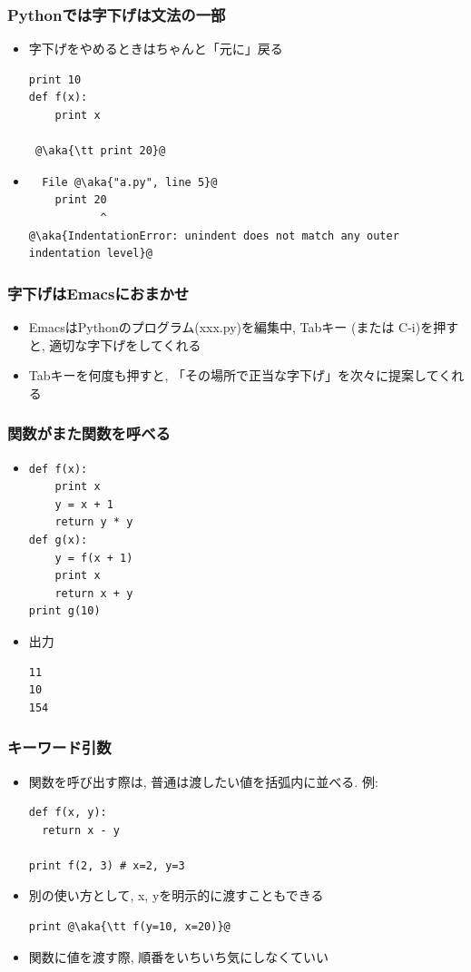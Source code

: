 \documentclass[10pt,dvipdfmx]{beamer}
\newcommand{\ao}[1]{{\color{blue}#1}}
\newcommand{\aka}[1]{{\color{red}#1}}
\begin{document}
\begin{frame}[fragile]
\frametitle{Pythonでは字下げは文法の一部}
\begin{itemize}
\item 字下げをやめるときはちゃんと「元に」戻る
\begin{lstlisting}
print 10
def f(x):
    print x

 @\aka{\tt print 20}@
\end{lstlisting}
\item 
\begin{lstlisting}
  File @\aka{"a.py", line 5}@
    print 20
           ^
@\aka{IndentationError: unindent does not match any outer indentation level}@
\end{lstlisting}
\end{itemize}
\end{frame}


\begin{frame}[fragile]
\frametitle{字下げはEmacsにおまかせ}
\begin{itemize}
\item EmacsはPythonのプログラム(xxx.py)を編集中, 
\ao{Tabキー (または C-i)を押すと, 適切な字下げ}をしてくれる
\item Tabキーを何度も押すと, 
「その場所で正当な字下げ」を次々に提案してくれる
\end{itemize}
\end{frame}


\begin{frame}[fragile]
\frametitle{関数がまた関数を呼べる}

\begin{itemize}
\item 
\begin{lstlisting}
def f(x):
    print x
    y = x + 1
    return y * y
def g(x):
    y = f(x + 1)
    print x
    return x + y
print g(10)
\end{lstlisting}
\item<2> 出力
\begin{lstlisting}
11
10
154
\end{lstlisting}
\end{itemize}
\end{frame}

\begin{frame}[fragile]
\frametitle{キーワード引数}
\begin{itemize}
\item 関数を呼び出す際は, 普通は渡したい値を括弧内に並べる. 例:
\begin{lstlisting}
def f(x, y):
  return x - y

print f(2, 3) # x=2, y=3
\end{lstlisting}

\item 別の使い方として, x, yを明示的に渡すこともできる
\begin{lstlisting}
print @\aka{\tt f(y=10, x=20)}@
\end{lstlisting}

\item 関数に値を渡す際, 順番をいちいち気にしなくていい
\end{itemize}
\end{frame}
\end{document}

